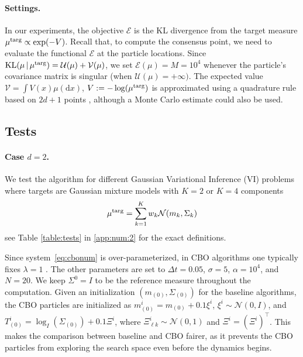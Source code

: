 \documentclass{article}
\theoremstyle{plain}
\theoremstyle{definition}
\theoremstyle{remark}
\newcommand{\E}{\mathcal{E}}
\newcommand{\KL}{\textup{KL}}
\newcommand{\targ}{\textup{targ}}
\newcommand{\rev}{}
\begin{document}
\paragraph{Settings.}
In our experiments, the objective $\E$ is the KL divergence from the target measure $\mu^\targ \propto \exp(-V)$. Recall that, to compute the consensus point, we need to evaluate the functional $\E$ at the particle locations. Since $\KL(\mu\,|\,\mu^\targ) = \mathcal{U}(\mu) + \mathcal{V}(\mu)$, we set $\E(\mu) = M = 10^4$ whenever the particle’s covariance matrix is singular (when $\mathcal{U}(\mu) = +\infty)$. The expected value $\mathcal{V} = \int V(x) \mu(\mathrm{d}x)$, $V := -\log(\mu^\targ)$ is approximated using a quadrature rule based on $2d+1$ points \cite{aras2009cubature}, although a Monte Carlo estimate could also be used.



\subsection{Tests}

\paragraph{Case $d = 2$.}
We test the algorithm for different Gaussian Variational Inference (VI) problems where targets are Gaussian mixture models with $K = 2$ or $K = 4$ components 
\begin{equation}\label{eq:gmm}
\mu^\targ = \sum_{k = 1}^{K}w_k \mathcal{N}(m_k, \Sigma_k)
\end{equation}
see Table \ref{table:tests} in \cref{app:num:2} for the exact definitions.

Since system~\eqref{eq:cbonum} is over-parameterized, in CBO algorithms one typically  fixes $\lambda = 1$ \cite{carrillo2021consensus}. The other parameters are set to \rev{$\Delta t = 0.05$}, $\sigma = 5$, $\alpha = 10^4$, and $N = 20$. We keep $\Sigma^0 = I$ to be the reference measure throughout the computation. Given an initialization $(m_{(0)}, \Sigma_{(0)})$ for the \rev{baseline algorithms}, the CBO particles are initialized as $m^i_{(0)} = m_{(0)} + 0.1 \xi^i$, $\xi^i\sim \mathcal{N}(0,I)$, and $T^i_{(0)} = \log_{I}(\Sigma_{(0)}) + 0.1 \Xi^i$, where $\Xi^i_{\ell k} \sim \mathcal{N}(0,1)$ and $\Xi^i = (\Xi^i)^\top$. This makes the comparison between \rev{baseline} and CBO fairer, as it prevents the CBO particles from exploring the search space even before the dynamics begins.
\end{document}

